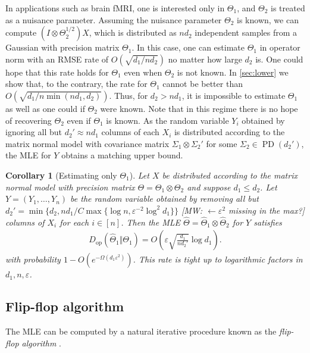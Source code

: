 \documentclass[aos]{imsart}
\newtheorem{corollary}[theorem]{Corollary}
\theoremstyle{definition}
\numberwithin{equation}{section}
\DeclareMathOperator{\PD}{PD}
\newcommand{\htheta}{\widehat{\Theta}}
\newcommand{\ot}{\otimes}
\newcommand{\eps}{\varepsilon}
\newcommand{\Dop}{D_{\operatorname{op}}}
\newcommand{\MW}[1]{{\color{red}[MW: #1]}}
\newcommand{\MW}[1]{{}}
\begin{document}
In applications such as brain fMRI, one is interested only in $\Theta_1$, and $\Theta_2$ is treated as a nuisance parameter.
Assuming the nuisance parameter $\Theta_2$ is known, we can compute $(I \ot \Theta_2^{1/2} )X$, which is distributed as $nd_2$ independent samples from a Gaussian with precision matrix $\Theta_1$.
In this case, one can estimate $\Theta_1$ in operator norm with an RMSE rate of $O(\sqrt{ d_1/ n d_2})$ no matter how large $d_2$ is.
One could hope that this rate holds for $\Theta_1$ even when $\Theta_2$ is not known.
In \cref{sec:lower} we show that, to the contrary, the rate for $\Theta_1$ cannot be better than $O(\sqrt{d_1/ n \min(n d_1, d_2)})$.
Thus, for $d_2 > n d_1$, it is impossible to estimate $\Theta_1$ as well as one could if $\Theta_2$ were known.
Note that in this regime there is no hope of recovering $\Theta_2$ even if $\Theta_1$ is known.
As the random variable $Y_i$ obtained by ignoring all but $d_2' \approx nd_1$ columns of each $X_i$ is distributed according to the matrix normal model with covariance matrix $\Sigma_1 \ot \Sigma_2'$ for some $\Sigma_2 \in \PD(d_2')$, the MLE for $Y$ obtains a matching upper bound.

\begin{corollary}[Estimating only $\Theta_1$]
Let $X$ be distributed according to the matrix normal model with precision matrix $\Theta = \Theta_1 \ot \Theta_2$ and suppose $d_1 \leq d_2$.
Let $Y = (Y_1, \dots, Y_n)$ be the random variable obtained by removing all but $d_2' = \min\{ d_2, n d_1/C \max\{ \log n, \eps^{-2} \log^2 d_1\}\}$ \MW{$\leftarrow \eps^2$ missing in the max?} columns of $X_i$ for each $i \in [n]$.
Then the MLE $\htheta = \htheta_1 \ot \htheta_2$ for $Y$ satisfies
\begin{align*}
  \Dop(\widehat{\Theta}_1 \Vert \Theta_1) = O\left(\eps \sqrt{\frac{d_1}{nd_2'}} \log d_1\right).
  \end{align*}
 with probability $1 - O(e^{ - \Omega( d_1 \eps^2)})$.
 This rate is tight up to logarithmic factors in $d_1, n, \eps$.
\end{corollary}

\subsection{Flip-flop algorithm}
The MLE can be computed by a natural iterative procedure known as the \emph{flip-flop algorithm} \citep{dutilleul1999mle,gurvits2004classical}.
\end{document}

